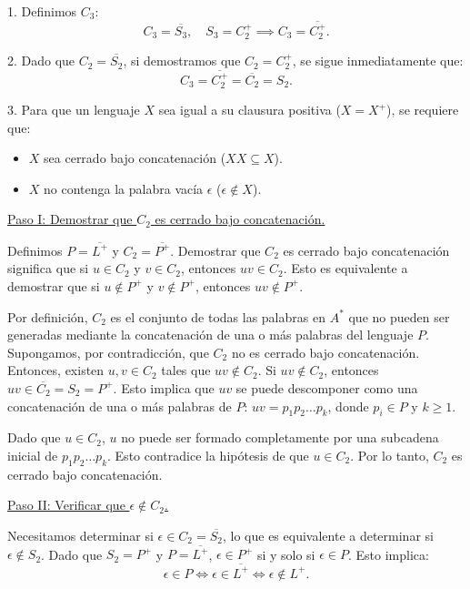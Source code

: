 \documentclass[12pt]{book} %
\begin{document}
\begin{solucion}
\begin{enumerate}[label=\alph*)]
    1. Definimos $C_3$:
        \[
        C_3 = \overline{S_3}, \quad S_3 = C_2^+ \implies C_3 = \overline{C_2^+}.
        \]

    2. Dado que $C_2 = \overline{S_2}$, si demostramos que $C_2 = C_2^+$, se sigue inmediatamente que:
        \[
        C_3 = \overline{C_2^+} = \overline{C_2} = S_2.
        \]

    3. Para que un lenguaje $X$ sea igual a su clausura positiva ($X = X^+$), se requiere que:
        \begin{itemize}
             \item $X$ sea cerrado bajo concatenación ($XX \subseteq X$).
             \item $X$ no contenga la palabra vacía $\epsilon$ ($\epsilon \notin X$).
        \end{itemize}

    \underline{Paso I: Demostrar que $C_2$ es cerrado bajo concatenación.}

    Definimos $P = \overline{L^+}$ y $C_2 = \overline{P^+}$. Demostrar que $C_2$ es cerrado bajo concatenación significa que si $u \in C_2$ y $v \in C_2$, entonces $uv \in C_2$. Esto es equivalente a demostrar que si $u \notin P^+$ y $v \notin P^+$, entonces $uv \notin P^+$.

    Por definición, $C_2$ es el conjunto de todas las palabras en $A^*$ que no pueden ser generadas mediante la concatenación de una o más palabras del lenguaje $P$. Supongamos, por contradicción, que $C_2$ no es cerrado bajo concatenación. Entonces, existen $u, v \in C_2$ tales que $uv \notin C_2$. Si $uv \notin C_2$, entonces $uv \in \overline{C_2} = S_2 = P^+$. Esto implica que $uv$ se puede descomponer como una concatenación de una o más palabras de $P$: $uv = p_1 p_2 \dots p_k$, donde $p_i \in P$ y $k \geq 1$.

    Dado que $u \in C_2$, $u$ no puede ser formado completamente por una subcadena inicial de $p_1 p_2 \dots p_k$. Esto contradice la hipótesis de que $u \in C_2$. Por lo tanto, $C_2$ es cerrado bajo concatenación.

    \underline{Paso II: Verificar que $\epsilon \notin C_2$.}

    Necesitamos determinar si $\epsilon \in C_2 = \overline{S_2}$, lo que es equivalente a determinar si $\epsilon \notin S_2$. Dado que $S_2 = P^+$ y $P = \overline{L^+}$, $\epsilon \in P^+$ si y solo si $\epsilon \in P$. Esto implica:
    \[
    \epsilon \in P \iff \epsilon \in \overline{L^+} \iff \epsilon \notin L^+.
    \]


\end{enumerate}
\end{solucion}
\end{document}
